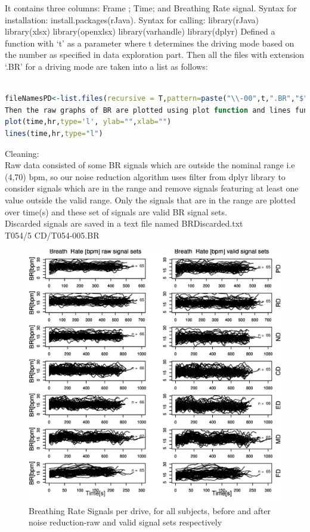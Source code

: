 \documentclass[a4paper]{article}
\begin{document}
It contains three columns: Frame ; Time; and Breathing Rate signal.  
Syntax for installation: install.packages(rJava).
Syntax for calling: 
library(rJava)
library(xlsx)
library(openxlsx)
library(varhandle)
library(dplyr)
Defined a function  with ‘t’ as a parameter where t determines the driving mode based on the number as specified in data exploration part.
Then all the files with extension ‘.BR’ for a driving mode are taken into a list as follows:

\begin{lstlisting}[language=R]

fileNamesPD<-list.files(recursive = T,pattern=paste("\\-00",t,".BR","$",sep = ""))
Then the raw graphs of BR are plotted using plot function and lines function.
plot(time,hr,type='l', ylab="",xlab="")
lines(time,hr,type="l")
\end{lstlisting}

Cleaning:\\
Raw data consisted of some BR signals which are outside the nominal range i.e (4,70) bpm, so our noise reduction algorithm uses filter from dplyr library to consider signals which are in the range and remove signals featuring at least one value outside the valid range. Only the signals that are in the range are plotted over time(s) and these set of signals are valid BR signal sets.\\
Discarded signals are saved in a text file named BRDiscarded.txt\\
T054/5 CD/T054-005.BR\\
\begin{figure}[!h]
\centering
\includegraphics[width=1.0\textwidth]{BR_Raw_Clean-page-001.jpg}
\caption{\label{fig:br}Breathing Rate Signals per drive, for all subjects, before and after noise reduction-raw and valid signal sets respectively}
\end{figure}
\end{document}
